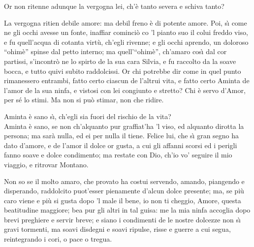 \documentclass{book}
\begin{document}
	\9 Or non ritenne adunque la vergogna
	lei, ch'\`e tanto severa e schiva tanto?

	\8 La vergogna ritien debile amore:
	ma debil freno \`e di potente amore.
	Poi, s\`{\i} come ne gli occhi avesse un fonte,
	inaffiar cominci\`o co 'l pianto suo
	il colui freddo viso, e fu quell'acqua
	di cotanta virt\`u, ch'egli rivenne;
	e gli occhi aprendo, un doloroso ``ohim\`e''
	spinse dal petto interno;
	ma quell'``ohim\`e'', ch'amaro
	cos\`{\i} dal cor partissi,
	s'incontr\`o ne lo spirto
	de la sua cara Silvia, e fu raccolto
	da la soave bocca, e tutto quivi
	subito raddolcissi.
	Or chi potrebbe dir come in quel punto
	rimanessero entrambi, fatto certo
	ciascun de l'altrui vita, e fatto certo
	Aminta de l'amor de la sua ninfa,
	e vistosi con lei congiunto e stretto?
	Chi \`e servo d'Amor, per s\'e lo stimi.
	Ma non si pu\`o stimar, non che ridire.

	\9 Aminta \`e sano s\`{\i}, ch'egli sia fuori
	del rischio de la vita? \\

   \8 Aminta \`e sano,
	se non ch'alquanto pur graffiat'ha 'l viso,
	ed alquanto dirotta la persona;
	ma sar\`a nulla, ed ei per nulla il tiene.
	Felice lui, che s\`{\i} gran segno ha dato
	d'amore, e de l'amor il dolce or gusta,
	a cui gli affanni scorsi ed i perigli
	fanno soave e dolce condimento;
	ma restate con Dio, ch'io vo' seguire
	il mio viaggio, e ritrovar Montano.

	\9 Non so se il molto amaro,
	che provato ha costui servendo, amando,
	piangendo e disperando,
	raddolcito puot'esser pienamente
	d'alcun dolce presente;
	ma, se pi\`u caro viene
	e pi\`u si gusta dopo 'l male il bene,
	io non ti cheggio, Amore,
	questa beatitudine maggiore;
	bea pur gli altri in tal guisa:
	me la mia ninfa accoglia
	dopo brevi preghiere e servir breve;
	e siano i condimenti
	de le nostre dolcezze
	non s\`{\i} gravi tormenti,
	ma soavi disdegni
	e soavi ripulse,
	risse e guerre a cui segua,
	reintegrando i cori, o pace o tregua.

\newpage
{}
\end{document}
